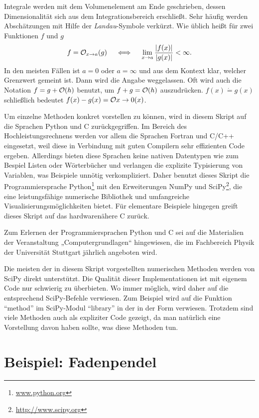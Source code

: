 Integrale werden mit dem Volumenelement am Ende geschrieben, dessen
Dimensionalität sich aus dem Integrationsbereich erschließt. Sehr
häufig werden Abschätzungen mit Hilfe der \emph{Landau}-Symbole
verkürzt. Wie üblich heißt für zwei Funktionen $f$ und $g$
\begin{equation*}
  f = \mathcal O_{x\to a}(g) \quad\iff\quad \lim_{x\to a}
  \frac{\lvert f(x)\rvert}{\lvert g(x)\rvert}<\infty.
\end{equation*}
In den meisten Fällen ist $a=0$ oder $a=\infty$ und aus dem Kontext
klar, welcher Grenzwert gemeint ist. Dann wird die Angabe
weggelassen. Oft wird auch die Notation $f = g + \mathcal O(h)$ benutzt, um $f
+ g = \mathcal O(h)$ auszudrücken. $f(x) \dot{=} g(x)$ schließlich bedeutet 
$f(x) - g(x) = \mathcal O{x\to 0}(x)$.

Um einzelne Methoden konkret vorstellen zu können, wird in diesem
Skript auf die Sprachen Python und C zurückgegriffen. Im Bereich des
Hochleistungsrechnens werden vor allem die Sprachen Fortran und C/C++
eingesetzt, weil diese in Verbindung mit guten Compilern sehr
effizienten Code ergeben. Allerdings bieten diese Sprachen keine
nativen Datentypen wie zum Bespiel Listen oder Wörterbücher und
verlangen die explizite Typisierung von Variablen, was Beispiele
unnötig verkompliziert. Daher benutzt dieses Skript die
Programmiersprache Python\footnote{\url{www.python.org}} mit den
Erweiterungen NumPy und SciPy\footnote{\url{http://www.scipy.org}},
die eine leistungsfähige numerische Bibliothek und umfangreiche
Visualisierungsmöglichkeiten bietet. Für elementare Beispiele hingegen
greift dieses Skript auf das hardwarenähere C zurück.

Zum Erlernen der Programmiersprachen Python und C sei auf die
Materialien der Veranstaltung „Computergrundlagen“ hingewiesen, die im
Fachbereich Physik der Universität Stuttgart jährlich angeboten
wird.

Die meisten der in diesem Skript vorgestellten numerischen Methoden
werden von SciPy direkt unterstützt. Die Qualität dieser
Implementationen ist mit eigenem Code nur schwierig zu überbieten. Wo
immer möglich, wird daher auf die entsprechend SciPy-Befehle
verwiesen. Zum Beispiel wird auf die Funktion "`method"' im
SciPy-Modul "`library"' in der in der Form
 verwiesen. Trotzdem
sind viele Methoden auch als expliziter Code gezeigt, da man natürlich
eine Vorstellung davon haben sollte, was diese Methoden tun.

\section{Beispiel: Fadenpendel}

